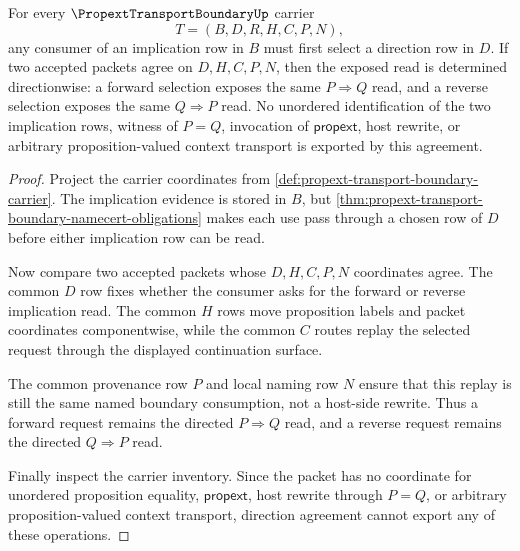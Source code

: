 \begin{theorem}
\label{thm:propext-transport-boundary-direction-determinacy}
For every $\PropextTransportBoundaryUp$ carrier
$$
T=(B,D,R,H,C,P,N),
$$
any consumer of an implication row in $B$ must first select a direction row in $D$. If two accepted packets agree on $D,H,C,P,N$, then the exposed read is determined directionwise: a forward selection exposes the same $P\Rightarrow Q$ read, and a reverse selection exposes the same $Q\Rightarrow P$ read. No unordered identification of the two implication rows, witness of $P=Q$, invocation of $\mathsf{propext}$, host rewrite, or arbitrary proposition-valued context transport is exported by this agreement.
\end{theorem}
\begin{proof}
Project the carrier coordinates from \autoref{def:propext-transport-boundary-carrier}. The implication evidence is stored in $B$, but \autoref{thm:propext-transport-boundary-namecert-obligations} makes each use pass through a chosen row of $D$ before either implication row can be read.

Now compare two accepted packets whose $D,H,C,P,N$ coordinates agree. The common $D$ row fixes whether the consumer asks for the forward or reverse implication read. The common $H$ rows move proposition labels and packet coordinates componentwise, while the common $C$ routes replay the selected request through the displayed continuation surface.

The common provenance row $P$ and local naming row $N$ ensure that this replay is still the same named boundary consumption, not a host-side rewrite. Thus a forward request remains the directed $P\Rightarrow Q$ read, and a reverse request remains the directed $Q\Rightarrow P$ read.

Finally inspect the carrier inventory. Since the packet has no coordinate for unordered proposition equality, $\mathsf{propext}$, host rewrite through $P=Q$, or arbitrary proposition-valued context transport, direction agreement cannot export any of these operations.
\end{proof}

